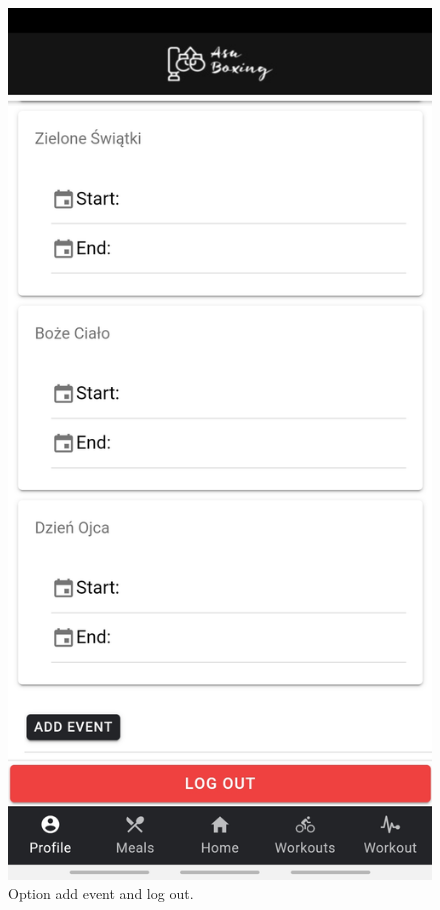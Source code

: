 \documentclass[a4paper,12pt]{report}
\begin{document}
\begin{figure}[ht]
\begin{minipage}[b]{0.5\linewidth}
    \includegraphics[width=.7\linewidth]{images/aplicationImages/calendarBottom.jpeg} 
    \caption{Option add event and log out.} 
    \vspace{4ex}
  \end{minipage} 
\end{figure}


\end{document}
